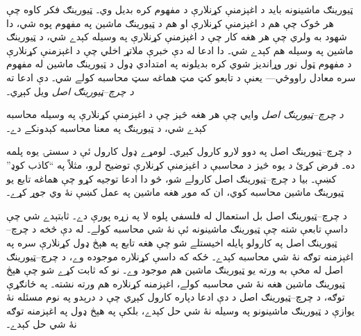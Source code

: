\documentclass[../../../include/open-logic-section]{subfiles}
\begin{document}

ټيورينګ ماشينونه بايد د اغېزمنې کړنلارې د مفهوم کره بديل وي۔ ټيورينګ
فکر کاوه چې هر څوک چې هم د اغېزمنې کړنلارې او هم د ټيورينګ ماشين په
مفهوم پوه شي، دا شهود به ولري چې هر هغه کار چې د اغېزمنې کړنلارې په
وسيله کېدے شي، د ټيورينګ ماشين په وسيله هم کېدے شي۔ دا ادعا له دې
خبرې ملاتړ اخلي چې د اغېزمنې کړنلارې د مفهوم ټول نور وړانديز شوي کره
بديلونه په امتدادي ډول د ټيورينګ ماشين له مفهوم سره معادل راووځي---
يعنې د تابعو کټ مټ هماغه سټ محاسبه کولے شي۔ دې ادعا ته
\emph{د چرچ--ټيورينګ اصل} ويل کېږي۔

\begin{defn}
\emph{د چرچ--ټيورينګ اصل} وايي چې هر هغه څيز چې د اغېزمنې کړنلارې
په وسيله محاسبه کېدے شي، د ټيورينګ په معنا محاسبه کېدونکے دے۔
\end{defn}

د چرچ--ټيورينګ اصل په دوو لارو کارول کېږي۔ لومړے ډول کارول ئې د
سستۍ يوه پلمه ده۔ فرض کړئ د يوه څيز د محاسبې د اغېزمنې کړنلارې
توضيح لرو، مثلاً په ``کاذب کوډ'' کښې۔ بيا د چرچ--ټيورينګ اصل کارولے
شو، څو دا ادعا توجيه کړو چې هماغه تابع يو ټيورينګ ماشين محاسبه کوي،
ان که موږ هغه ماشين په عمل کښې نۀ وي جوړ کړے۔

د چرچ--ټيورينګ اصل بل استعمال له فلسفي پلوه لا په زړه پورې دے۔
ثابتېدے شي چې داسې تابعې شته چې ټيورينګ ماشينونه ئې نۀ شي محاسبه
کولے۔ له دې څخه د چرچ--ټيورينګ اصل په کارولو پايله اخيستلے شو چې
هغه تابع په هېڅ ډول کړنلارې سره په اغېزمنه توګه نۀ شي محاسبه کېدے۔
ځکه که داسې کړنلاره موجوده وے، د چرچ--ټيورينګ اصل له مخې به ورته يو
ټيورينګ ماشين هم موجود وے۔ نو که ثابت کړے شو چې هېڅ ټيورينګ ماشين
هغه نۀ شي محاسبه کولے، اغېزمنه کړنلاره هم ورته نشته۔ په ځانګړې توګه،
د چرچ--ټيورينګ اصل د دې ادعا دپاره کارول کېږي چې د درېدو په نوم
مسئله نۀ يوازې د ټيورينګ ماشينونو په وسيله نۀ شي حل کېدے، بلکې په
هېڅ ډول په اغېزمنه توګه نۀ شي حل کېدے۔
\end{document}
